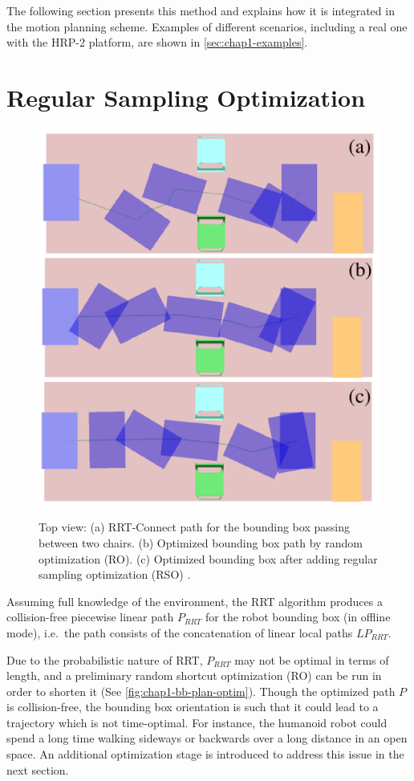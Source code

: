 The following section presents this method and explains how it is
integrated in the motion planning scheme. Examples of different
scenarios, including a real one with the HRP-2 platform, are shown in
\autoref{sec:chap1-examples}.

\section{Regular Sampling Optimization}
\label{sec:chap1-regular-sampling-optim}

\begin{figure}
  \centering
      {\includegraphics[width = 0.8\linewidth]
        {src/chap1-path-optimization/bb-plan-optim.pdf}}
      \caption[Solution paths for the bounding box.]{Top view: (a)
        RRT-Connect path for the bounding box passing between two
        chairs. (b) Optimized bounding box path by random optimization
        (RO). (c) Optimized bounding box after adding regular sampling
        optimization (RSO) .}
      \label{fig:chap1-bb-plan-optim}
\end{figure}

Assuming full knowledge of the environment, the RRT algorithm produces
\linebreak a collision-free piecewise linear path $P_{RRT}$ for the
robot bounding box (in offline mode), i.e.\ the path consists of the
concatenation of linear local paths $LP_{RRT}$.

Due to the probabilistic nature of RRT, $P_{RRT}$ may not be optimal
in terms of length, and a preliminary random shortcut optimization
(RO) can be run in order to shorten it (See
\autoref{fig:chap1-bb-plan-optim}). Though the optimized path $P$ is
collision-free, the bounding box orientation is such that it could
lead to a trajectory which is not time-optimal. For instance, the
humanoid robot could spend a long time walking sideways or backwards
over a long distance in an open space. An additional optimization
stage is introduced to address this issue in the next section.

